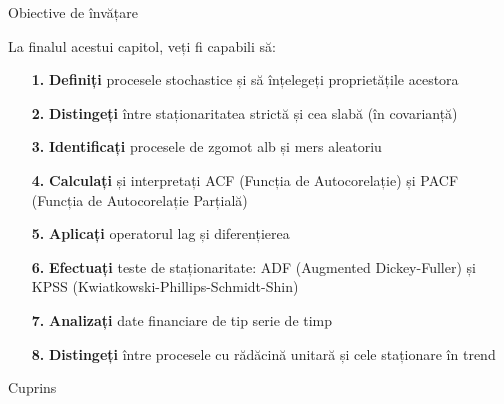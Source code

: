 \documentclass[9pt, aspectratio=169, t]{beamer}
\subtitle{Capitolul 1: Procese Stochastice și Staționaritate}
\begin{document}
{
\begin{frame}
    \titlepage
\end{frame}
}

\begin{frame}{Obiective de învățare}
    \begin{cminipage}{0.95\textwidth}
        \begin{block}{La finalul acestui capitol, veți fi capabili să:}
            \begin{enumerate}\setlength{\itemsep}{0pt}
                \item[\textcolor{MainBlue}{\textbf{1.}}] \textbf{Definiți} procesele stochastice și să înțelegeți proprietățile acestora
                \item[\textcolor{MainBlue}{\textbf{2.}}] \textbf{Distingeți} între staționaritatea strictă și cea slabă (în covarianță)
                \item[\textcolor{MainBlue}{\textbf{3.}}] \textbf{Identificați} procesele de zgomot alb și mers aleatoriu
                \item[\textcolor{MainBlue}{\textbf{4.}}] \textbf{Calculați} și interpretați ACF (Funcția de Autocorelație) și PACF (Funcția de Autocorelație Parțială)
                \item[\textcolor{MainBlue}{\textbf{5.}}] \textbf{Aplicați} operatorul lag și diferențierea
                \item[\textcolor{MainBlue}{\textbf{6.}}] \textbf{Efectuați} teste de staționaritate: ADF (Augmented Dickey-Fuller) și KPSS (Kwiatkowski-Phillips-Schmidt-Shin)
                \item[\textcolor{MainBlue}{\textbf{7.}}] \textbf{Analizați} date financiare de tip serie de timp
                \item[\textcolor{MainBlue}{\textbf{8.}}] \textbf{Distingeți} între procesele cu rădăcină unitară și cele staționare în trend
            \end{enumerate}
        \end{block}
    \end{cminipage}
\end{frame}

\begin{frame}{Cuprins}
    \tableofcontents
\end{frame}
\end{document}
